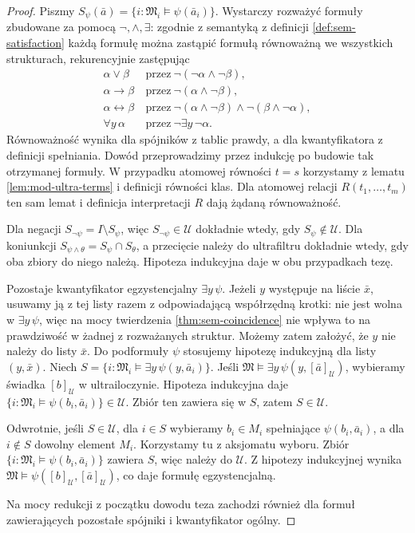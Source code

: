 \begin{proof}
Piszmy $S_\psi(\bar a)=\{i:\mathfrak M_i\models\psi(\bar a_i)\}$.
Wystarczy rozważyć formuły zbudowane za pomocą $\neg,\land,\exists$:
zgodnie z semantyką z definicji \ref{def:sem-satisfaction}
każdą formułę można zastąpić formułą równoważną we wszystkich
strukturach, rekurencyjnie zastępując
\[
\begin{aligned}
\alpha\lor\beta&\ \text{przez}\ \neg(\neg\alpha\land\neg\beta),\\
\alpha\to\beta&\ \text{przez}\ \neg(\alpha\land\neg\beta),\\
\alpha\leftrightarrow\beta&\ \text{przez}\
\neg(\alpha\land\neg\beta)\land\neg(\beta\land\neg\alpha),\\
\forall y\,\alpha&\ \text{przez}\ \neg\exists y\,\neg\alpha.
\end{aligned}
\]
Równoważność wynika dla spójników z tablic prawdy, a dla
kwantyfikatora z definicji spełniania. Dowód przeprowadzimy
przez indukcję po budowie tak otrzymanej formuły.
W przypadku atomowej równości $t=s$ korzystamy z lematu
\ref{lem:mod-ultra-terms} i definicji równości klas.
Dla atomowej relacji $R(t_1,\ldots,t_m)$ ten sam lemat i
definicja interpretacji $R$ dają żądaną równoważność.

Dla negacji $S_{\neg\psi}=I\setminus S_\psi$, więc
$S_{\neg\psi}\in\mathcal U$ dokładnie wtedy, gdy
$S_\psi\notin\mathcal U$. Dla koniunkcji
$S_{\psi\land\theta}=S_\psi\cap S_\theta$, a przecięcie należy
do ultrafiltru dokładnie wtedy, gdy oba zbiory do niego należą.
Hipoteza indukcyjna daje w obu przypadkach tezę.

Pozostaje kwantyfikator egzystencjalny $\exists y\,\psi$.
Jeżeli $y$ występuje na liście $\bar x$, usuwamy ją z tej listy
razem z odpowiadającą współrzędną krotki: nie jest wolna
w $\exists y\,\psi$, więc na mocy twierdzenia
\ref{thm:sem-coincidence} nie wpływa to na prawdziwość
w żadnej z rozważanych struktur. Możemy zatem założyć,
że $y$ nie należy do listy $\bar x$. Do podformuły $\psi$
stosujemy hipotezę indukcyjną dla listy $(y,\bar x)$.
Niech
$S=\{i:\mathfrak M_i\models\exists y\,\psi(y,\bar a_i)\}$.
Jeśli $\mathfrak M\models\exists y\,\psi(y,[\bar a]_{\mathcal U})$,
wybieramy świadka $[b]_{\mathcal U}$ w ultrailoczynie.
Hipoteza indukcyjna daje
$\{i:\mathfrak M_i\models\psi(b_i,\bar a_i)\}\in\mathcal U$.
Zbiór ten zawiera się w $S$, zatem $S\in\mathcal U$.

Odwrotnie, jeśli $S\in\mathcal U$, dla $i\in S$ wybieramy
$b_i\in M_i$ spełniające $\psi(b_i,\bar a_i)$, a dla $i\notin S$
dowolny element $M_i$. Korzystamy tu z aksjomatu wyboru.
Zbiór $\{i:\mathfrak M_i\models\psi(b_i,\bar a_i)\}$
zawiera $S$, więc należy do $\mathcal U$. Z hipotezy indukcyjnej
wynika $\mathfrak M\models\psi([b]_{\mathcal U},[\bar a]_{\mathcal U})$,
co daje formułę egzystencjalną.

Na mocy redukcji z początku dowodu teza zachodzi również
dla formuł zawierających pozostałe spójniki i kwantyfikator ogólny.
\end{proof}

